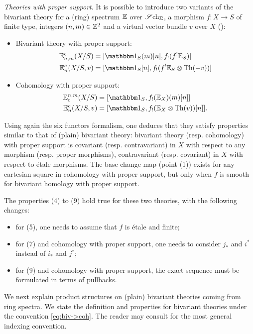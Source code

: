 \begin{num}\textit{Theories with proper support}.\label{num:biv_support}
It is possible to introduce
two variants of the bivariant theory for a (ring) spectrum $\mathbb E$ over $\operatorname{\mathscr Sch_\Sigma}$,
a morphism $f:X \rightarrow S$ of finite type, integers $(n,m) \in \mathbb{Z}^2$
and a virtual vector bundle $v$ over $X$
(\cite[Def. 2.2.1]{DJK}):
\begin{itemize}
\item Bivariant theory with proper support:
\begin{align*}
\E_{n,m}^c(X/S)&=[\un_S(m)[n],f_!(f^!\E_S)] \\
\E_{n}^c(X/S,v)&=[\un_S[n],f_!(f^!\E_S \otimes \Th(-v))]
\end{align*}
\item Cohomology with proper support:
\begin{align*}
\E^{n,m}_c(X/S)&=[\un_S,f_!(\E_X)(m)[n]] \\
\E_{n}^c(X/S,v)&=[\un_S,f_!(\E_X \otimes \Th(v))[n]].
\end{align*}
\end{itemize}
Using again the six functors formalism, one deduces that they satisfy properties similar
to that of (plain) bivariant theory:
bivariant theory (resp. cohomology) with proper support is covariant (resp. contravariant) 
in $X$ with respect to any morphism (resp. proper morphisms), contravariant (resp. covariant)
in $X$ with respect to \'etale morphisms. The base change map (point (1)) exists for any cartesian square
in cohomology with proper support,
but only when $f$ is smooth for bivariant homology with proper support.

The properties (4) to (9) hold true for these two theories, with the following changes:
\begin{itemize}
\item for (5), one needs to assume that $f$ is \'etale and finite;
\item for (7) and cohomology with proper support, one needs to consider $j_*$ and $i^*$
instead of $i_*$ and $j^*$;
\item for (9) and cohomology with proper support,
the exact sequence  must be formulated in terms of pullbacks.
\end{itemize}
\end{num}

We next explain product structures on (plain) bivariant theories coming from ring spectra. We state the definition and properties for bivariant theories under the convention \eqref{eq:biv->coh}. The reader may consult \cite[\S 2.2.7 (4)]{DJK} for the most general indexing convention. 


